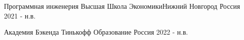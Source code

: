 

\begin{cventries}

  \cventry
    {Программная инженерия} %
    {Высшая Школа Экономики{\enskip\cdotp\enskip}Нижний Новгород} %
    {Россия} %
    {2021 - н.в.} %
    {
      \begin{cvitems} %
      \end{cvitems}
    }

\end{cventries}


\begin{cventries}

  \cventry
    {Академия Бэкенда} %
    {Тинькофф Образование} %
    {Россия} %
    {2022 - н.в.} %
    {
      \begin{cvitems} %
      \end{cvitems}
    }

\end{cventries}
